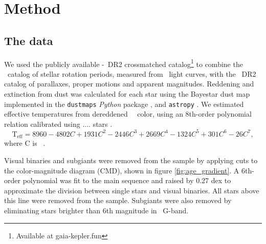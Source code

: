 
\section{Method}
\label{sec:method}

\subsection{The data}
\label{sec:the_data}

We used the publicly available \kepler-\gaia\ DR2 crossmatched
catalog\footnote{Available at gaia-kepler.fun} to combine the \mct\ catalog of
stellar rotation periods, measured from \kepler\ light curves, with the \gaia\
DR2 catalog of parallaxes, proper motions and apparent magnitudes.
Reddening and extinction from dust was calculated for each star using the
Bayestar dust map implemented in the {\tt dustmaps} {\it Python} package
\citep{green2018}, and {\tt astropy} \citep{astropy2013}.
We estimated effective temperatures from dereddened \Gaia\ \gcolor\ color,
using an 8th-order polynomial relation calibrated using .... stars
\racomment{ask Jason for details}.
\begin{equation}
    \mathrm{T_{eff}} = 8960 -4802C + 1931C^2 -2446C^3 + 2669C^4 - 1324C^5 +
    301C^6 - 26C^7,
\label{eq:curtis}
\end{equation}
where C is \gaia\ \gcolor.

Visual binaries and subgiants were removed from the sample by applying cuts to
the color-magnitude diagram (CMD), shown in figure \ref{fig:age_gradient}.
A 6th-order polynomial was fit to the main sequence and raised by 0.27 dex to
approximate the division between single stars and visual binaries.
All stars above this line were removed from the sample.
Subgiants were also removed by eliminating stars brighter than 6th magnitude
in \gaia\ G-band.

